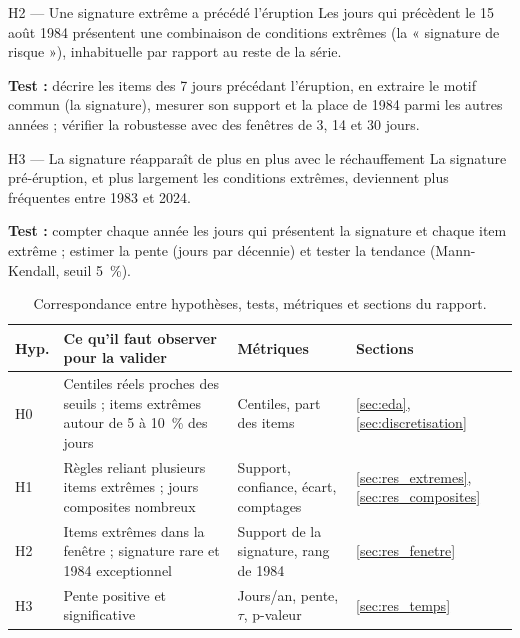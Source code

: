 \documentclass[12pt, a4paper]{article}
\begin{document}
\begin{hypothese}{H2 — Une signature extrême a précédé l'éruption}
Les jours qui précèdent le 15 août 1984 présentent une combinaison de conditions extrêmes
(la « signature de risque »), inhabituelle par rapport au reste de la série.

\textbf{Test :} décrire les items des 7 jours précédant l'éruption, en extraire le motif commun
(la signature), mesurer son support et la place de 1984 parmi les autres années ; vérifier la
robustesse avec des fenêtres de 3, 14 et 30 jours.
\end{hypothese}

\begin{hypothese}{H3 — La signature réapparaît de plus en plus avec le réchauffement}
La signature pré-éruption, et plus largement les conditions extrêmes, deviennent plus
fréquentes entre 1983 et 2024.

\textbf{Test :} compter chaque année les jours qui présentent la signature et chaque item
extrême ; estimer la pente (jours par décennie) et tester la tendance (Mann-Kendall, seuil
5~\%).
\end{hypothese}

\begin{table}[H]
\centering
\caption{Correspondance entre hypothèses, tests, métriques et sections du rapport.}
\label{tab:plan_hyp}
\small
{}
\begin{tabular}{p{1.1cm}>{\raggedright\arraybackslash}p{5.4cm}>{\raggedright\arraybackslash}p{4.6cm}p{2.2cm}}
\toprule
\rowcolor{NuitBleue!90}
\color{white}\textbf{Hyp.} & \color{white}\textbf{Ce qu'il faut observer pour la valider} & \color{white}\textbf{Métriques} & \color{white}\textbf{Sections} \\
\midrule
H0 & Centiles réels proches des seuils ; items extrêmes autour de 5 à 10~\% des jours & Centiles, part des items & \ref{sec:eda}, \ref{sec:discretisation} \\
H1 & Règles reliant plusieurs items extrêmes ; jours composites nombreux & Support, confiance, écart, comptages & \ref{sec:res_extremes}, \ref{sec:res_composites} \\
H2 & Items extrêmes dans la fenêtre ; signature rare et 1984 exceptionnel & Support de la signature, rang de 1984 & \ref{sec:res_fenetre} \\
H3 & Pente positive et significative & Jours/an, pente, $\tau$, p-valeur & \ref{sec:res_temps} \\
\bottomrule
\end{tabular}
\end{table}
\end{document}
